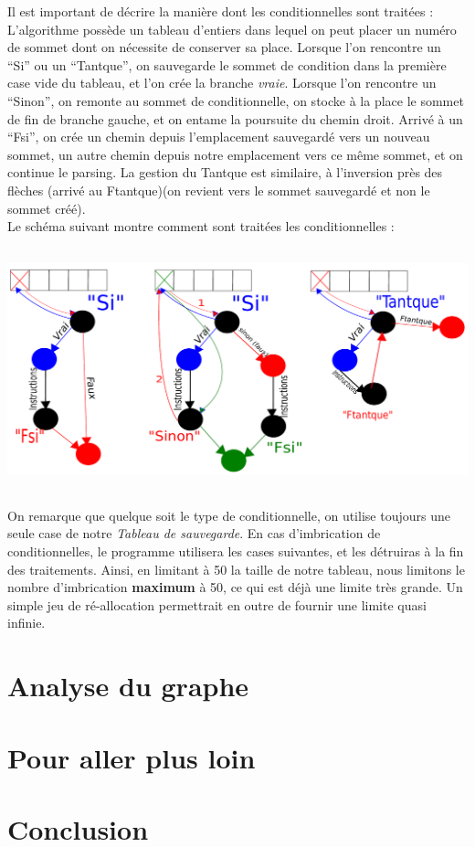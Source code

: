 \documentclass[a4paper,11pt]{article}
\begin{document}
		Il est important de décrire la manière dont les conditionnelles sont traitées :\\
		L'algorithme possède un tableau d'entiers dans lequel on peut placer un numéro de sommet dont on nécessite de conserver sa place. Lorsque l'on rencontre un ``Si'' ou un ``Tantque'', on sauvegarde le sommet de condition dans la première case vide du tableau, et l'on crée la branche \textit{vraie}. Lorsque l'on rencontre un ``Sinon'', on remonte au sommet de conditionnelle, on stocke à la place le sommet de fin de branche gauche, et on entame la poursuite du chemin droit. Arrivé à un ``Fsi'', on crée un chemin depuis l'emplacement sauvegardé vers un nouveau sommet, un autre chemin depuis notre emplacement vers ce même sommet, et on continue le parsing. La gestion du Tantque est similaire, à l'inversion près des flèches (arrivé au Ftantque)(on revient vers le sommet sauvegardé et non le sommet créé).\\
		 Le schéma suivant montre comment sont traitées les conditionnelles :
		\begin{center}\includegraphics[width=17cm,height=7cm]{dessin.pdf}\end{center}
	On remarque que quelque soit le type de conditionnelle, on utilise toujours une seule case de notre \textit{Tableau de sauvegarde}. En cas d'imbrication de conditionnelles, le programme utilisera les cases suivantes, et les détruiras à la fin des traitements. Ainsi, en limitant à 50 la taille de notre tableau, nous limitons le nombre d'imbrication \textbf{maximum} à 50, ce qui est déjà une limite très grande. Un simple jeu de ré-allocation permettrait en outre de fournir une limite quasi infinie.
	\section{Analyse du graphe}
	\section{Pour aller plus loin}
	\section{Conclusion}
\end{document}
